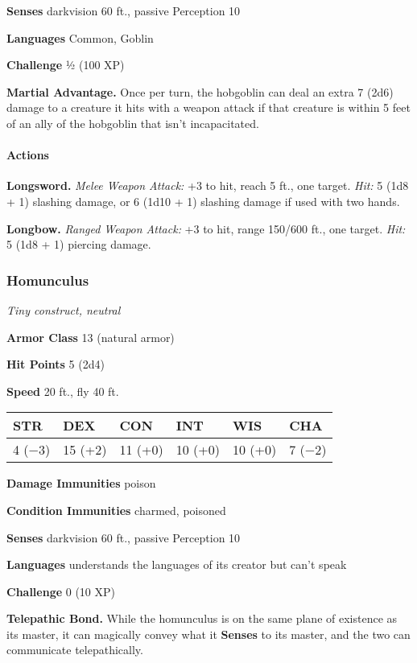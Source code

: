 \documentclass[
]{article}
\begin{document}
\textbf{Senses} darkvision 60 ft., passive Perception 10

\textbf{Languages} Common, Goblin

\textbf{Challenge} ½ (100 XP)

\textbf{Martial Advantage.} Once per turn, the hobgoblin can deal an
extra 7 (2d6) damage to a creature it hits with a weapon attack if that
creature is within 5 feet of an ally of the hobgoblin that isn't
incapacitated.

\hypertarget{actions-7}{%
\paragraph{Actions}\label{actions-7}}

\textbf{Longsword.} \emph{Melee Weapon Attack:} +3 to hit, reach 5 ft.,
one target. \emph{Hit:} 5 (1d8 + 1) slashing damage, or 6 (1d10 + 1)
slashing damage if used with two hands.

\textbf{Longbow.} \emph{Ranged Weapon Attack:} +3 to hit, range 150/600
ft., one target. \emph{Hit:} 5 (1d8 + 1) piercing damage.

\hypertarget{homunculus}{%
\subsubsection{Homunculus}\label{homunculus}}

\emph{Tiny construct, neutral}

\textbf{Armor Class} 13 (natural armor)

\textbf{Hit Points} 5 (2d4)

\textbf{Speed} 20 ft., fly 40 ft.

\begin{longtable}[]{@{}llllll@{}}
\toprule
STR & DEX & CON & INT & WIS & CHA\tabularnewline
\midrule
\endhead
4 (−3) & 15 (+2) & 11 (+0) & 10 (+0) & 10 (+0) & 7 (−2)\tabularnewline
\bottomrule
\end{longtable}

\textbf{Damage Immunities} poison

\textbf{Condition Immunities} charmed, poisoned

\textbf{Senses} darkvision 60 ft., passive Perception 10

\textbf{Languages} understands the languages of its creator but can't
speak

\textbf{Challenge} 0 (10 XP)

\textbf{Telepathic Bond.} While the homunculus is on the same plane of
existence as its master, it can magically convey what it \textbf{Senses}
to its master, and the two can communicate telepathically.
\end{document}
